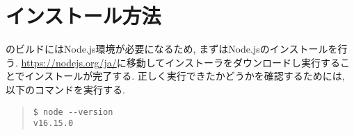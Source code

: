 \chapter{インストール方法}

\tacsim のビルドにはNode.js環境が必要になるため, まずはNode.jsのインストールを行う.
\url{https://nodejs.org/ja/}に移動してインストーラをダウンロードし実行することでインストールが完了する. 正しく実行できたかどうかを確認するためには, 以下のコマンドを実行する.

\begin{quote}
\begin{verbatim}
$ node --version
v16.15.0
\end{verbatim}
\end{quote}

\tacsim